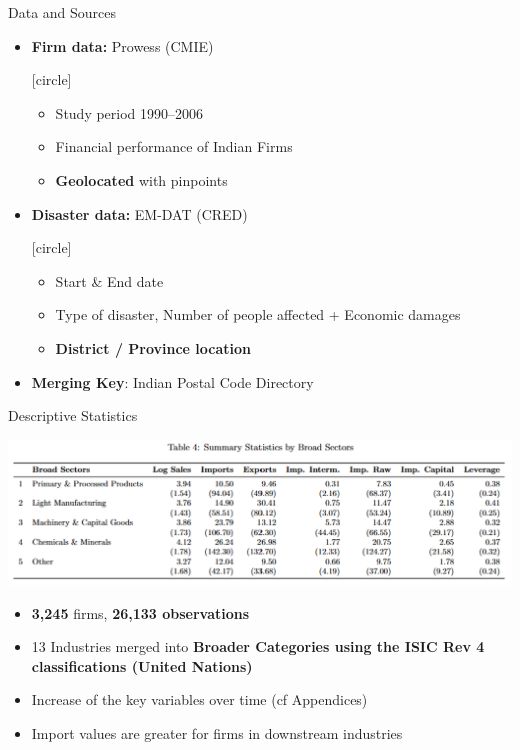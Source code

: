 \documentclass[
  xcolor=svgnames,
  bookmarks=true,
  bookmarksopen=true,
  pdfborder={0 0 0},
  pdfhighlight={/N},
  linkbordercolor={rgb}{0.5,0.5,0.5},
  implicit=false,
  colorlinks=true,
  allcolors=deepblue
]{beamer}
\begin{document}
\begin{frame}{Data and Sources}
\begin{itemize}
    \item \textbf{Firm data:} Prowess (CMIE)
     {[circle]
    \begin{itemize}
        \item Study period 1990--2006
        \item Financial performance of Indian Firms
        \item \textbf{Geolocated} with pinpoints
    \end{itemize}
    }
\vspace{0.3cm}
\item \textbf{Disaster data:} EM-DAT (CRED)
 {[circle]
    \begin{itemize}
        \item Start \& End date
        \item Type of disaster, Number of people affected + Economic damages
        \item \textbf{District / Province location}
    \end{itemize}
    }
\vspace{0.3cm}
\item \textbf{Merging Key}: Indian Postal Code Directory

\end{itemize}
\end{frame}

\begin{frame}{Descriptive Statistics}
\vspace{-1cm}
\begin{minipage}{1.1\textwidth}
    \centering
    \includegraphics[width=\linewidth]{Summary Stat sectors.png}
\end{minipage}
\vspace{0.5cm}
\begin{itemize}
    \item \textbf{3,245} firms, \textbf{26,133 observations}
    \item 13 Industries merged into \textbf{Broader Categories using the ISIC Rev 4 classifications (United Nations)}
    \item Increase of the key variables over time (cf Appendices)
    \item Import values are greater for firms in downstream industries
\end{itemize}
\end{frame}
\end{document}
